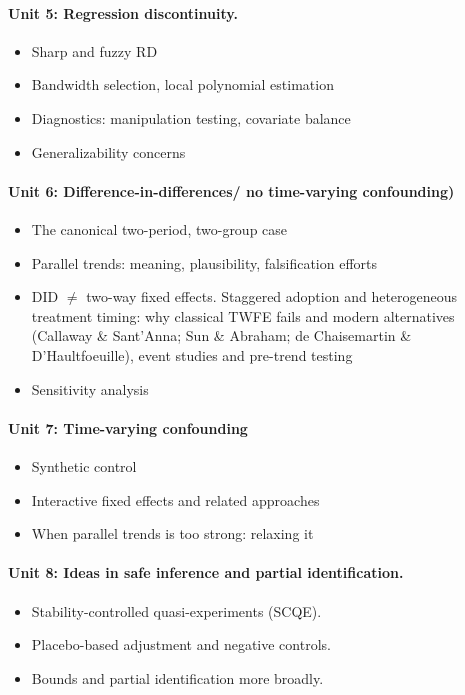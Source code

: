 \documentclass[PS]{syllabus}
\begin{document}
\begin{syllabus}
\paragraph{Unit 5: Regression discontinuity.}
\begin{itemize}
\item Sharp and fuzzy RD
\item Bandwidth selection, local polynomial estimation
\item Diagnostics: manipulation testing, covariate balance
\item Generalizability concerns
\end{itemize}

\paragraph{Unit 6: Difference-in-differences/ no time-varying confounding)}
\begin{itemize}
\item The canonical two-period, two-group case
\item Parallel trends: meaning, plausibility, falsification efforts
\item DID $\neq$ two-way fixed effects. Staggered adoption and heterogeneous treatment timing: why classical TWFE fails and modern alternatives (Callaway \& Sant'Anna; Sun \& Abraham; de Chaisemartin \& D'Haultfoeuille), event studies and pre-trend testing
\item Sensitivity analysis
\end{itemize}

\paragraph{Unit 7: Time-varying confounding}
\begin{itemize}
\item Synthetic control
\item Interactive fixed effects and related approaches
\item When parallel trends is too strong: relaxing it
\end{itemize}

\paragraph{Unit 8: Ideas in safe inference and partial identification.}
\begin{itemize}
\item Stability-controlled quasi-experiments (SCQE).
\item Placebo-based adjustment and negative controls.
\item Bounds and partial identification more broadly.
\end{itemize}


\end{syllabus}
\end{document}
